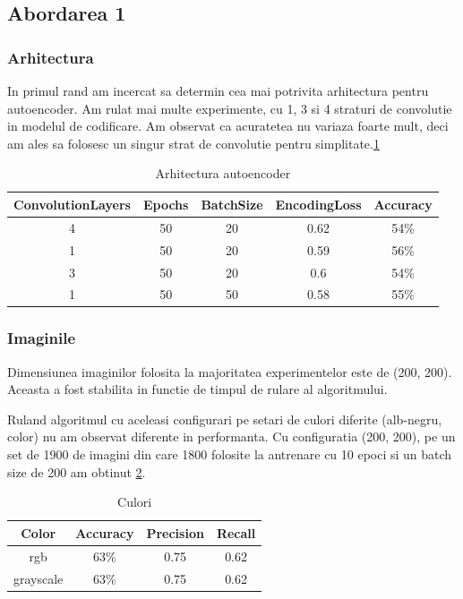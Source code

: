 \documentclass{article}
\begin{document}
\subsection{Abordarea 1}

\subsubsection{Arhitectura}
In primul rand am incercat sa determin cea mai potrivita arhitectura pentru autoencoder. Am rulat mai multe experimente, cu 1, 3 si 4 straturi de convolutie in modelul de codificare. Am observat ca acuratetea nu variaza foarte mult, deci am ales sa folosesc un singur strat de convolutie pentru simplitate.\ref{tab:arh}

\begin{table}[h!]
  \begin{center}
    \caption{Arhitectura autoencoder}
    \label{tab:arh}
    \begin{tabular}{c|c|c|c|c}
      \textbf{ConvolutionLayers} & \textbf{Epochs} & \textbf{BatchSize} & \textbf{EncodingLoss} & \textbf{Accuracy}\\
      \hline
      4 & 50 & 20 & 0.62 & 54\% \\
      1 & 50 & 20 & 0.59 & 56\% \\
      3 & 50 & 20 & 0.6 & 54\%  \\
      1 & 50 & 50 & 0.58 & 55\% \\
      \end{tabular}
  \end{center}
\end{table}

\subsubsection{Imaginile}
Dimensiunea imaginilor folosita la majoritatea experimentelor este de (200, 200). Aceasta a fost stabilita in functie de timpul de rulare al algoritmului. 

Ruland algoritmul cu aceleasi configurari pe setari de culori diferite (alb-negru, color) nu am observat diferente in performanta.
Cu configuratia (200, 200), pe un set de 1900 de imagini din care 1800 folosite la antrenare cu 10 epoci si un batch size de 200 am obtinut \ref{tab:resColor}.
\begin{table}[h!]
 
  \begin{center}
    \caption{Culori}
    \label{tab:resColor}
    \begin{tabular}{c|c|c|c}
      \textbf{Color} & \textbf{Accuracy} & \textbf{Precision} & \textbf{Recall} \\
      \hline
      rgb & 63\% & 0.75  & 0.62 \\
      grayscale & 63\% & 0.75 & 0.62 \\
      \end{tabular}
  \end{center}
\end{table}
\end{document}
